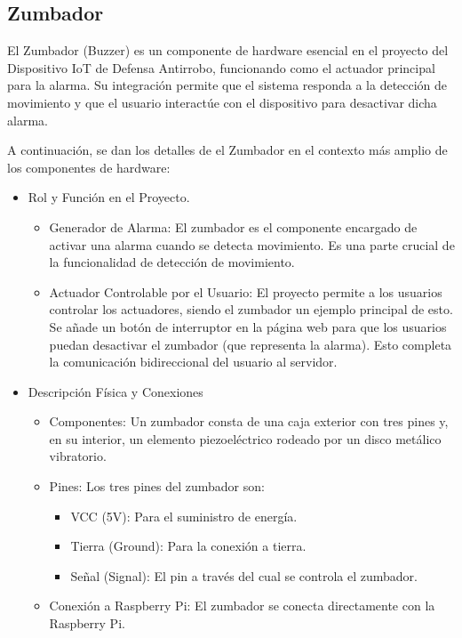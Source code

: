 \documentclass{report}
\begin{document}
\subsection{Zumbador}
El Zumbador (Buzzer) es un componente de hardware esencial en el proyecto del Dispositivo IoT de Defensa Antirrobo, funcionando como el actuador principal 
para la alarma. Su integración permite que el sistema responda a la detección de movimiento y que el usuario interactúe con el dispositivo para 
desactivar dicha alarma.

A continuación, se dan los detalles de el Zumbador en el contexto más amplio de los componentes de hardware:
\begin{itemize}

    \item Rol y Función en el Proyecto.
    \begin{itemize}
        \item Generador de Alarma: El zumbador es el componente encargado de activar una alarma cuando se detecta movimiento. Es una parte crucial 
        de la funcionalidad de detección de movimiento.
        \item Actuador Controlable por el Usuario: El proyecto permite a los usuarios controlar los actuadores, siendo el zumbador un ejemplo principal 
        de esto. Se añade un botón de interruptor en la página web para que los usuarios puedan desactivar el zumbador (que representa la alarma). 
        Esto completa la comunicación bidireccional del usuario al servidor.
    \end{itemize}

    \item Descripción Física y Conexiones
    \begin{itemize}
        \item Componentes: Un zumbador consta de una caja exterior con tres pines y, en su interior, un elemento piezoeléctrico rodeado por un 
        disco metálico vibratorio.
        \item Pines: Los tres pines del zumbador son:
        \begin{itemize}
            \item VCC (5V): Para el suministro de energía.
            \item Tierra (Ground): Para la conexión a tierra.
            \item Señal (Signal): El pin a través del cual se controla el zumbador.
        \end{itemize}
        \item Conexión a Raspberry Pi: El zumbador se conecta directamente con la Raspberry Pi.
    \end{itemize}


\end{itemize}
\end{document}
